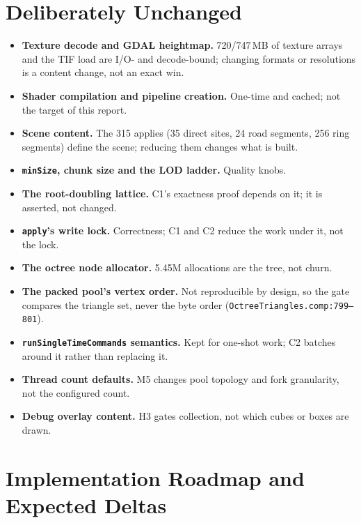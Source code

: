 \documentclass[11pt,a4paper]{article}
\begin{document}
\section{Deliberately Unchanged}
\label{sec:unchanged29}

\begin{itemize}[leftmargin=1.4em,itemsep=2pt]
\item \textbf{Texture decode and GDAL heightmap.} 720/747\,MB of texture
arrays and the TIF load are I/O- and decode-bound; changing formats or
resolutions is a content change, not an exact win.
\item \textbf{Shader compilation and pipeline creation.} One-time and cached;
not the target of this report.
\item \textbf{Scene content.} The 315 applies (35 direct sites, 24 road segments,
256 ring segments) define the scene; reducing them changes what is built.
\item \textbf{\texttt{minSize}, chunk size and the LOD ladder.} Quality knobs.
\item \textbf{The root-doubling lattice.} C1's exactness proof depends on it;
it is asserted, not changed.
\item \textbf{\texttt{apply}'s write lock.} Correctness; C1 and C2 reduce the
work under it, not the lock.
\item \textbf{The octree node allocator.} 5.45M allocations are the tree, not
churn.
\item \textbf{The packed pool's vertex order.} Not reproducible by design, so
the gate compares the triangle set, never the byte order
(\texttt{OctreeTriangles.comp:799--801}).
\item \textbf{\texttt{runSingleTimeCommands} semantics.} Kept for one-shot
work; C2 batches around it rather than replacing it.
\item \textbf{Thread count defaults.} M5 changes pool topology and fork
granularity, not the configured count.
\item \textbf{Debug overlay content.} H3 gates collection, not which cubes or
boxes are drawn.
\end{itemize}

\section{Implementation Roadmap and Expected Deltas}
\end{document}
